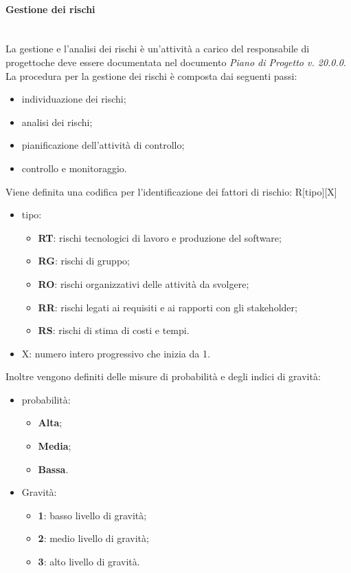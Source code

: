 		\paragraph{Gestione dei rischi}\mbox{}\\ [1mm]
		La gestione e l'analisi dei rischi è un'attività a carico del responsabile di progetto\glosp che deve essere documentata nel documento \textit{Piano di Progetto v. 20.0.0}.
		La procedura per la gestione dei rischi è composta dai seguenti passi:
		\begin{itemize}
			\item individuazione dei rischi;
			\item analisi dei rischi;
			\item pianificazione dell'attività di controllo;
			\item controllo e monitoraggio.
		\end{itemize}
		Viene definita una codifica per l'identificazione dei fattori di rischio: R[tipo][X]
		\begin{itemize}
			\item tipo:
			\begin{itemize}
				\item \textbf{RT}: rischi tecnologici di lavoro e produzione del software;
				\item \textbf{RG}: rischi di gruppo;
				\item \textbf{RO}: rischi organizzativi delle attività da svolgere;
				\item \textbf{RR}: rischi legati ai requisiti e ai rapporti con gli stakeholder\glo;
				\item \textbf{RS}: rischi di stima di costi e tempi.
			\end{itemize}
			\item X: numero intero progressivo che inizia da 1.
		\end{itemize}
		Inoltre vengono definiti delle misure di probabilità e degli indici di gravità:
		\begin{itemize}
			\item probabilità:
			\begin{itemize}
				\item \textbf{Alta};
				\item \textbf{Media};
				\item \textbf{Bassa}.
			\end{itemize}
			\item Gravità:
			\begin{itemize}
				\item \textbf{1}: basso livello di gravità;
				\item \textbf{2}: medio livello di gravità;
				\item \textbf{3}: alto livello di gravità.
			\end{itemize}
		\end{itemize}
